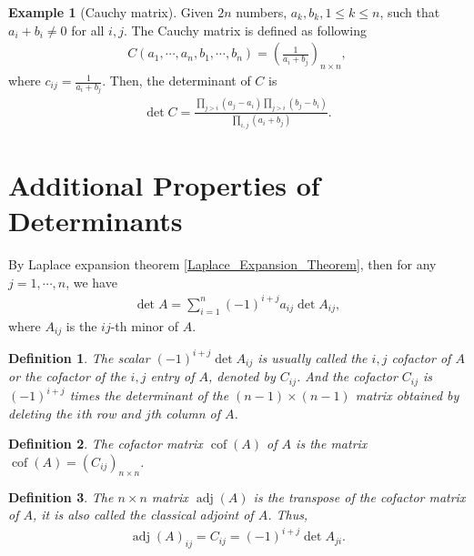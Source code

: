 \documentclass[11pt]{book}
\newtheorem{definition}{Definition}[chapter]
\theoremstyle{definition}
\newtheorem{example}{Example}[chapter]
\numberwithin{equation}{chapter}
\begin{document}
\medskip

\begin{example}[Cauchy matrix]
Given $2n$ numbers, $a_k, b_k, 1\leq k\leq n$, such that $a_i + b_i \neq 0$ for all $i,j$. The Cauchy matrix is defined as following
\begin{align*}
    C(a_1,\cdots,a_n, b_1,\cdots,b_n) = \left(\frac{1}{a_i + b_j}\right)_{n\times n}
,\end{align*}
where $c_{ij} = \frac{1}{a_i + b_j}$. Then, the determinant of $C$ is 
\begin{align*}
    \det C = \frac{\prod_{j>i}(a_j - a_i)\prod_{j>i}(b_j - b_i)}{\prod_{i,j}(a_i + b_j)}.
\end{align*}
\end{example}

\medskip

\section{Additional Properties of Determinants}
By Laplace expansion theorem \ref{Laplace_Expansion_Theorem}, then for any $j = 1, \cdots, n$, we have
\begin{align*}
    \det A = \sum^n_{i=1} (-1)^{i+j} a_{ij} \det A_{ij},
\end{align*}
where $A_{ij}$ is the $ij$-th minor of $A$.

\medskip

\begin{definition}
The scalar $(-1)^{i+j} \det A_{ij}$ is usually called the $i,j$ cofactor of $A$ or the cofactor of the $i,j$ entry of $A$, denoted by $C_{ij}$. And the cofactor $C_{ij}$ is $(-1)^{i+j}$ times the determinant of the $(n-1) \times (n-1)$ matrix obtained by deleting the $i$th row and $j$th column of $A$.
\end{definition}

\medskip

\begin{definition}
The cofactor matrix $\operatorname{cof}(A)$ of $A$ is the matrix $\operatorname{cof}(A) = \left(C_{ij}\right)_{n \times n}$.
\end{definition}

\medskip

\begin{definition}
The $n \times n$ matrix $\operatorname{adj}(A)$ is the transpose of the cofactor matrix of $A$, it is also called the classical adjoint of $A$. Thus, 
\begin{align*}
    \operatorname{adj}(A)_{ij} = C_{ij} = (-1)^{i+j} \det A_{ji}.
\end{align*}
\end{definition}
\end{document}
